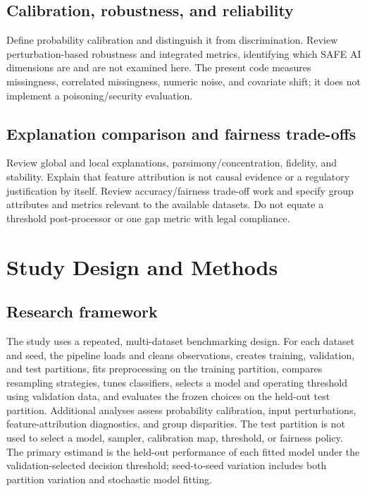 \documentclass[pdflatex,sn-mathphys-num]{sn-jnl}
\begin{document}
\subsection{Calibration, robustness, and reliability}
Define probability calibration and distinguish it from discrimination. Review perturbation-based robustness and integrated metrics, identifying which SAFE AI dimensions are and are not examined here. The present code measures missingness, correlated missingness, numeric noise, and covariate shift; it does not implement a poisoning/security evaluation.

\subsection{Explanation comparison and fairness trade-offs}
Review global and local explanations, parsimony/concentration, fidelity, and stability. Explain that feature attribution is not causal evidence or a regulatory justification by itself. Review accuracy/fairness trade-off work and specify group attributes and metrics relevant to the available datasets. Do not equate a threshold post-processor or one gap metric with legal compliance.

\section{Study Design and Methods}
\subsection{Research framework}
The study uses a repeated, multi-dataset benchmarking design. For each dataset and seed, the pipeline loads and cleans observations, creates training, validation, and test partitions, fits preprocessing on the training partition, compares resampling strategies, tunes classifiers, selects a model and operating threshold using validation data, and evaluates the frozen choices on the held-out test partition. Additional analyses assess probability calibration, input perturbations, feature-attribution diagnostics, and group disparities. The test partition is not used to select a model, sampler, calibration map, threshold, or fairness policy. The primary estimand is the held-out performance of each fitted model under the validation-selected decision threshold; seed-to-seed variation includes both partition variation and stochastic model fitting.
\end{document}
